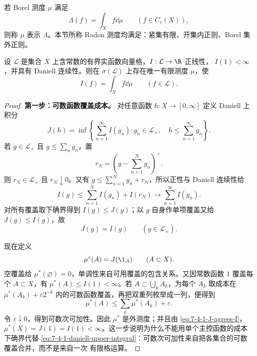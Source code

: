 \begin{definition}[表示测度]\label{def:7-4-1-3}
若 Borel 测度 $\mu$ 满足
\[
 \Lambda(f)=\int_X f\dd\mu\qquad(f\in C_c(X)),
\]
则称 $\mu$ 表示 $\Lambda$。本节所称 Radon 测度均满足：紧集有限、开集内正则、Borel 集外正则。
\end{definition}

\begin{theorem}\label{theorem:7-4-1-1}
设 $\mathcal L$ 是集合 $X$ 上含常数的有界实函数向量格，$I:\mathcal L\to\R$ 正线性，
$I(1)<\infty$，并具有 Daniell 连续性。则在 $\sigma(\mathcal L)$ 上存在唯一有限测度 $\mu$，使
\[
 I(f)=\int_X f\dd\mu\qquad(f\in\mathcal L).
\]
\end{theorem}

\begin{proof}
\textbf{第一步：可数函数覆盖成本。}
对任意函数 $h:X\to[0,\infty]$ 定义 Daniell 上积分
\begin{equation}\label{eq:7-4-1-daniell-upper-integral}
 J(h)=\inf\left\{
   \sum_{n=1}^\infty I(g_n):
   g_n\in\mathcal L_+,\quad
   h\le\sum_{n=1}^\infty g_n
 \right\}.
\end{equation}
若 $g\in\mathcal L_+$ 且 $g\le\sum_ng_n$，置
\[
 r_N=\left(g-\sum_{n=1}^Ng_n\right)^+.
\]
则 $r_N\in\mathcal L_+$ 且 $r_N\downarrow0$。又有
$g\le\sum_{n=1}^Ng_n+r_N$，所以正性与 Daniell 连续性给
\begin{equation}\label{eq:7-4-1-cover-dominates}
 I(g)\le\sum_{n=1}^NI(g_n)+I(r_N)
 \longrightarrow\sum_{n=1}^\infty I(g_n).
\end{equation}
对所有覆盖取下确界得到 $I(g)\le J(g)$；以 $g$ 自身作单项覆盖又给 $J(g)\le I(g)$，故
\begin{equation}\label{eq:7-4-1-J-agrees-I}
 J(g)=I(g)\qquad(g\in\mathcal L_+).
\end{equation}

现在定义
\begin{equation}\label{eq:7-4-1-daniell-outer}
 \mu^*(A)=J(\1_A)\qquad(A\subset X).
\end{equation}
空覆盖给 $\mu^*(\varnothing)=0$，单调性来自可用覆盖的包含关系。又因常数函数 $1$ 覆盖每个
$A\subset X$，有 $\mu^*(A)\leq I(1)<\infty$。若
$A\subset\bigcup_kA_k$，为每个 $A_k$ 取成本在
$\mu^*(A_k)+\varepsilon2^{-k}$ 内的可数函数覆盖，再把双重列枚举成一列，便得到
\[
 \mu^*(A)\le\sum_k\mu^*(A_k)+\varepsilon.
\]
令 $\varepsilon\downarrow0$，得到可数次可加性。因此 $\mu^*$ 是外测度；并且由
\eqref{eq:7-4-1-J-agrees-I}，
$\mu^*(X)=J(1)=I(1)<\infty$。这一步说明为什么不能用单个主控函数的成本下确界代替
\eqref{eq:7-4-1-daniell-upper-integral}：可数次可加性来自把各集合的可数覆盖合并，而不是来自一次
有限格运算。


\end{proof}
